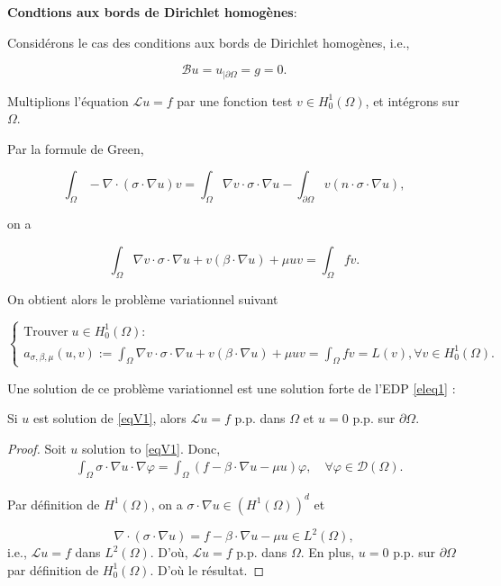 {\bf Condtions aux bords de Dirichlet homogènes}: 

Considérons le cas des conditions aux bords de Dirichlet homogènes, i.e.,   

$$\mathcal{B} u=u_{|\partial \Omega}=g=0.
$$ 


Multiplions  l'équation $\mathcal{L} u=f$ par une fonction test  $v\in H^1_0(\Omega)$, et intégrons  sur  $\Omega$. 

Par la formule de  Green, 

\begin{equation}\label{green}
\int_{\Omega}-\nabla \cdot(\sigma \cdot \nabla u) v=\int_{\Omega} \nabla v \cdot \sigma \cdot \nabla u-\int_{\partial \Omega} v(n \cdot \sigma \cdot \nabla u),
\end{equation}

on a  

$$
\int_{\Omega} \nabla v \cdot \sigma \cdot \nabla u+v(\beta \cdot \nabla u)+\mu u v=\int_{\Omega} f v.
$$

On obtient alors le problème variationnel suivant 

\begin{equation}\label{eqV1}
\left\{\begin{array}{l}
\text{Trouver} \; u\in H_{0}^{1}(\Omega) : \\
	a_{\sigma,\beta,\mu}(u, v):=\int_{\Omega} \nabla v \cdot \sigma \cdot \nabla u+v(\beta \cdot \nabla u)+\mu u v=\int_{\Omega} f v=L(v), \forall v\in  H_{0}^{1}(\Omega).
\end{array}\right.
\end{equation}

Une solution de ce  problème variationnel est une solution forte de l'EDP  \eqref{eleq1} :

\begin{proposition}
	
 Si $u$ est solution de  \eqref{eqV1}, alors  $\mathcal{L} u=f$ p.p. dans  $\Omega$ et  $u=0$ p.p. sur  $\partial \Omega$.
 
\end{proposition}

\begin{proof}
Soit    $u$  solution to  \eqref{eqV1}.  Donc,
$$
\begin{aligned}
	&\int_{\Omega} \sigma \cdot \nabla u \cdot \nabla \varphi =\int_{\Omega}(f-\beta \cdot \nabla u-\mu u) \varphi, \quad \forall \varphi \in \mathcal{D}(\Omega).
\end{aligned}
$$

Par définition de $H^1(\Omega)$, on a $ \sigma \cdot \nabla u\in  (H^1(\Omega))^d$ et 

$$
\nabla \cdot( \sigma \cdot \nabla u)=f-\beta \cdot \nabla u-\mu u\in L^2(\Omega),
 $$
i.e., $\mathcal{L} u=f$ dans  $L^{2}(\Omega) .$ D'où, $\mathcal{L} u=f$ p.p. dans  $\Omega$. En plus,  $u=0$ p.p. sur  $\partial \Omega$ par définition de  $H_{0}^{1}(\Omega)$.  D'où le résultat.
\end{proof}

